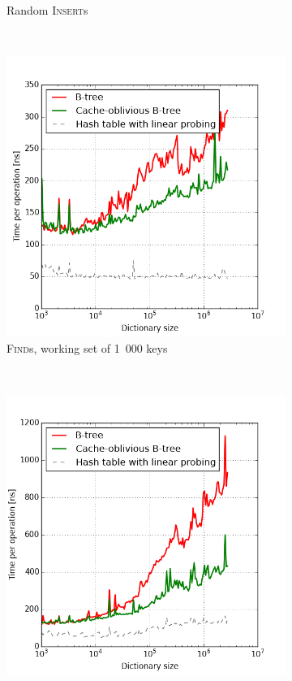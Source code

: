 \begin{figure}
\begin{subfigure}[t]{0.45\textwidth}
	\caption{Random \textsc{Insert}s}
\end{subfigure}
~
\begin{subfigure}[t]{0.45\textwidth}
	\includegraphics[width=\textwidth]{img/performance/cob-performance-3}
	\caption{\textsc{Find}s, working set of 1~000 keys}
\end{subfigure}
~
\begin{subfigure}[t]{0.45\textwidth}
	\includegraphics[width=\textwidth]{img/performance/cob-performance-4}

\end{subfigure}
\end{figure}
